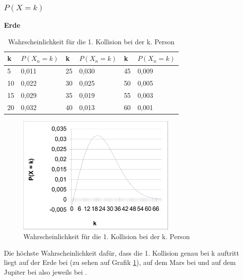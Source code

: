 \documentclass[../main.tex]{subfiles}
\begin{document}
\subsubsection{$P(X = k)$}

\textbf{Erde}

\begin{table}[h]
\centering
\begin{tabular}{|l|l|l|l|l|l|}
\hline
k  & $P(X_{n} = k)$ & k  & $P(X_{n} = k)$ & k  & $P(X_{n} = k)$ \\ \hline
5  & 0,011            & 25 & 0,030            & 45 & 0,009            \\
10 & 0,022            & 30 & 0,025            & 50 & 0,005            \\
15 & 0,029            & 35 & 0,019            & 55 & 0,003            \\
20 & 0,032            & 40 & 0,013            & 60 & 0,001      \\ \hline
\end{tabular}
\caption{\label{num.tpeqe} Wahrscheinlichkeit für die 1. Kollision bei der k. Person}
\end{table}

\begin{figure}[h]
\begin{center}
 \includegraphics[width=0.7\textwidth]{../graphics/peq.png}
\end{center}
\caption{\label{num.fpeqe} Wahrscheinlichkeit für die 1. Kollision bei der k. Person}
\end{figure}



Die höchste Wahrscheinlichkeit dafür, dass die 1. Kollision genau bei k auftritt liegt auf der Erde bei  (zu sehen auf Grafik \ref{num.fpeqe}), auf dem Mars bei  und auf dem Jupiter bei  also jeweils bei .
\end{document}
